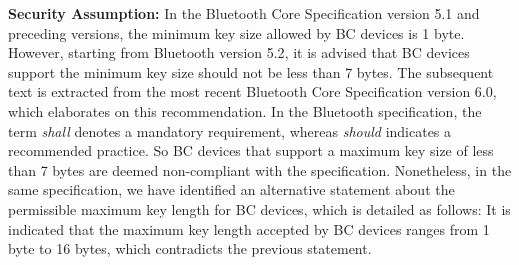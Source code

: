 \documentclass[../main.tex]{subfiles}  %
\begin{document}
\noindent
\textbf{Security Assumption:} 
In the Bluetooth Core Specification version 5.1\cite{bluetooth51} and preceding versions, the minimum key size allowed by BC devices is 1 byte.
However, starting from Bluetooth version 5.2\cite{bluetooth52}, it is advised that BC devices support the minimum key size should not be less than 7 bytes.
The subsequent text is extracted from the most recent Bluetooth Core Specification version 6.0\cite{bluetooth6}, which elaborates on this recommendation.
In the Bluetooth specification, the term \emph{shall} denotes a mandatory requirement, whereas \emph{should} indicates a recommended practice.
So BC devices that support a maximum key size of less than 7 bytes are deemed non-compliant with the specification.
Nonetheless, in the same specification, we have identified an alternative statement about the permissible maximum key length for BC devices, which is detailed as follows:
It is indicated that the maximum key length accepted by BC devices ranges from 1 byte to 16 bytes, which contradicts the previous statement.
\end{document}
